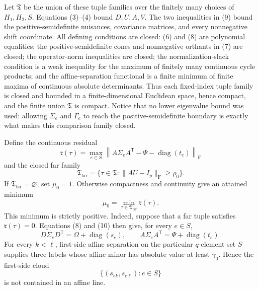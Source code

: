 Let \(\mathfrak T\) be the union of these tuple families over the finitely many choices of \(H_1,H_2,S\). Equations (3)--(4) bound \(D,U,A,V\). The two inequalities in (9) bound the positive-semidefinite nuisances, covariance matrices, and every nonnegative shift coordinate. All defining conditions are closed: (6) and (8) are polynomial equalities; the positive-semidefinite cones and nonnegative orthants in (7) are closed; the operator-norm inequalities are closed; the normalization-slack condition is a weak inequality for the maximum of finitely many continuous cycle products; and the affine-separation functional is a finite minimum of finite maxima of continuous absolute determinants. Thus each fixed-index tuple family is closed and bounded in a finite-dimensional Euclidean space, hence compact, and the finite union \(\mathfrak T\) is compact. Notice that no lower eigenvalue bound was used: allowing \(\Sigma_e\) and \(\Gamma_e\) to reach the positive-semidefinite boundary is exactly what makes this comparison family closed.

Define the continuous residual
\[
\mathfrak r(\tau)=
\max_{e\in S}
\left\|A\Sigma_eA^{\mathsf T}
-\Psi-\operatorname{diag}(t_e)\right\|_{\mathrm F}
\tag{10}
\]
and the closed far family
\[
\mathfrak T_{\mathrm{far}}
=\{\tau\in\mathfrak T:\|AU-I_p\|_{\mathrm F}\geq\rho_0\}.
\tag{11}
\]
If \(\mathfrak T_{\mathrm{far}}=\varnothing\), set \(\mu_0=1\). Otherwise compactness and continuity give an attained minimum
\[
\mu_0=\min_{\tau\in\mathfrak T_{\mathrm{far}}}\mathfrak r(\tau).
\tag{12}
\]
This minimum is strictly positive. Indeed, suppose that a far tuple satisfies \(\mathfrak r(\tau)=0\). Equations (8) and (10) then give, for every \(e\in S\),
\[
D\Sigma_eD^{\mathsf T}=\Omega+\operatorname{diag}(s_e),
\qquad
A\Sigma_eA^{\mathsf T}=\Psi+\operatorname{diag}(t_e).
\tag{13}
\]
For every \(k<\ell\), first-side affine separation on the particular \(q\)-element set \(S\) supplies three labels whose affine minor has absolute value at least \(\gamma_0\). Hence the first-side cloud
\[
\{(s_{ek},s_{e\ell}):e\in S\}
\]
is not contained in an affine line.

